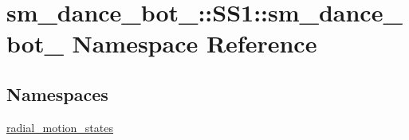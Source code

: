 \hypertarget{namespacesm__dance__bot__2_1_1SS1_1_1sm__dance__bot__2}{}\section{sm\+\_\+dance\+\_\+bot\+\_\+:\+:S\+S1\+:\+:sm\+\_\+dance\+\_\+bot\+\_ Namespace Reference}
\label{namespacesm__dance__bot__2_1_1SS1_1_1sm__dance__bot__2}
\subsection*{Namespaces}
\begin{DoxyCompactItemize}
\item 
 \hyperlink{namespacesm__dance__bot__2_1_1SS1_1_1sm__dance__bot__2_1_1radial__motion__states}{radial\+\_\+motion\+\_\+states}
\end{DoxyCompactItemize}
